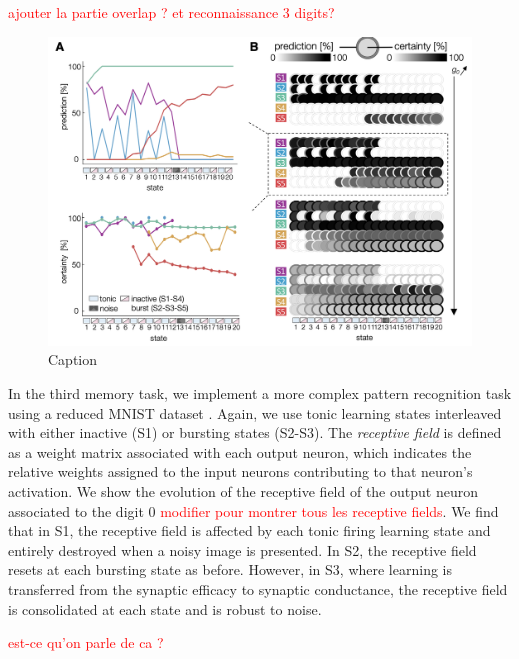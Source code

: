 \textcolor{red}{ajouter la partie overlap ? et reconnaissance 3 digits? }


\begin{figure}
    \centering
    \includegraphics[scale=0.4]{fig/Task/Fig3_flake.png}
    \caption{Caption}
    \label{fig:Task_3_flake}
\end{figure}



In the third memory task, we implement a more complex pattern recognition task using a reduced MNIST dataset \citep{garg_voltage-dependent_2022}. Again, we use tonic learning states interleaved with either inactive (S1) or bursting states (S2-S3). The \textit{receptive field} is defined as a weight matrix associated with each output neuron, which indicates the relative weights assigned to the input neurons contributing to that neuron's activation. We show the evolution of the receptive field of the output neuron associated to the digit 0 \textcolor{red}{modifier pour montrer tous les receptive fields}. We find that in S1, the receptive field is affected by each tonic firing learning state and entirely destroyed when a noisy image is presented. In S2, the receptive field resets at each bursting state as before. However, in S3, where learning is transferred from the synaptic efficacy to synaptic conductance, the receptive field is consolidated at each state and is robust to noise. 


\textcolor{red}{est-ce qu'on parle de ca ? }

